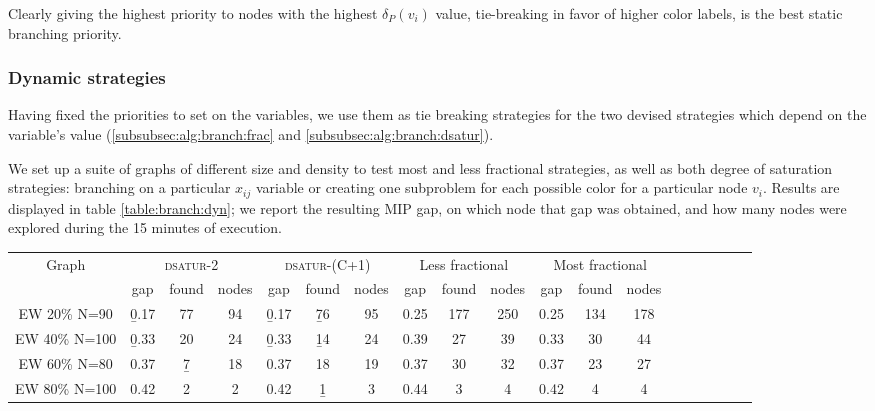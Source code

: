 Clearly giving the highest priority to nodes with the highest $\delta_P(v_i)$ value, tie-breaking in favor of higher color labels, is the best static branching priority.

\subsubsection*{Dynamic strategies}

Having fixed the priorities to set on the variables, we use them as tie breaking strategies for the two devised strategies which depend on the variable's value (\ref{subsubsec:alg:branch:frac} and \ref{subsubsec:alg:branch:dsatur}). 

We set up a suite of graphs of different size and density to test most and less fractional strategies, as well as both degree of saturation strategies: branching on a particular $x_{ij}$ variable or creating one subproblem for each possible color for a particular node $v_i$. Results are displayed in table \ref{table:branch:dyn}; we report the resulting MIP gap, on which node that gap was obtained, and how many nodes were explored during the 15 minutes of execution.

\begin{sidewaystable}
\label{table:branch:dyn}
\centering

\begin{tabular}{|c|ccc|ccc|ccc|ccc|ccc|ccc|}
\hline
\multicolumn{1}{|c|}{Graph} & \multicolumn{3}{|c|}{\textsc{dsatur-2}} & \multicolumn{3}{|c|}{\textsc{dsatur-(C+1)}} & \multicolumn{3}{|c|}{Less fractional} & \multicolumn{3}{|c|}{Most fractional} 
\\
 & gap & found & nodes & gap & found & nodes & gap & found & nodes & gap & found & nodes
\\
\hline
EW 20\% N=90 & \b{0.17} & 77 & 94 & \b{0.17} & \b{76} & 95 & 0.25 & 177 & 250 & 0.25 & 134 & 178 
\\
EW 40\% N=100 & \b{0.33} & 20 & 24 & \b{0.33} & \b{14} & 24 & 0.39 & 27 & 39 & 0.33 & 30 & 44 
\\
EW 60\% N=80 & 0.37 & \b{7} & 18 & 0.37 & 18 & 19 & 0.37 & 30 & 32 & 0.37 & 23 & 27 
\\
EW 80\% N=100 & 0.42 & 2 & 2 & 0.42 & \b{1} & 3 & 0.44 & 3 & 4 & 0.42 & 4 & 4
\\
\hline 
 \end{tabular}

\caption{Results for fractional and degree of saturation (spanning either $2$ or $C+1$ subproblems) branching strategies on branch and bound schemes. Data reported is MIP gap after $15$ minutes of execution, on which node (in thousands) that gap was found, and how many nodes (in thousands) were explored in total.}

\end{sidewaystable}

